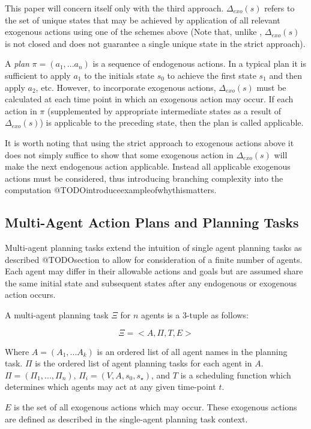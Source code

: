 \documentclass{article}
\theoremstyle{plain}
\theoremstyle{definition}
\begin{document}
This paper will concern itself only with the third approach. $\Delta_{exo}(s)$ refers to the set of unique states that may be achieved by application of all relevant exogenous actions using one of the schemes above (Note that, unlike \cite{lind2019ethical}, $\Delta_{exo}(s)$ is not closed and does not guarantee a single unique state in the strict approach).

A \textit{plan} $\pi=(a_1,...a_n)$ is a sequence of endogenous actions. In a typical plan it is sufficient to apply $a_1$ to the initials state $s_0$ to achieve the first state $s_1$ and then apply $a_2$, etc. However, to incorporate exogenous actions, $\Delta_{exo}(s)$ must be calculated at each time point in which an exogenous action may occur. If each action in $\pi$ (supplemented by appropriate intermediate states as a result of $\Delta_{exo}(s)$) is applicable to the preceding state, then the plan is called applicable. 

It is worth noting that using the strict approach to exogenous actions above it does not simply suffice to show that some exogenous action in $\Delta_{exo}(s)$ will make the next endogenous action applicable. Instead all applicable exogenous actions must be considered, thus introducing branching complexity into the computation @TODOintroduceexampleofwhythismatters.



\subsection{Multi-Agent Action Plans and Planning Tasks}
Multi-agent planning tasks extend the intuition of single agent planning tasks as described @TODOsection to allow for consideration of a finite number of agents. Each agent may differ in their allowable actions and goals but are assumed share the same initial state and subsequent states after any endogenous or exogenous action occurs.

A multi-agent planning task $\Xi$ for $n$ agents is a 3-tuple as follows:

\[
\Xi = <A, \Pi, T, E>
\]

 Where $A=(A_1,...A_k)$ is an ordered list of all agent names in the planning task. $\Pi$ is the ordered list of agent planning tasks for each agent in $A$. $\Pi=(\Pi_1,...,\Pi_n)$, $\Pi_i=(V,A,s_0,s_\star)$, and $T$ is a scheduling function which determines which agents may act at any given time-point $t$.
 
$E$ is the set of all exogenous actions which may occur. These exogenous actions are defined as described in the single-agent planning task context.
 
\end{document}
